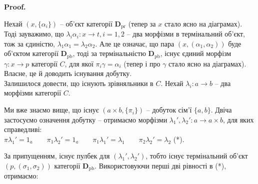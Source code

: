 \documentclass[a4paper, 10pt]{article}
\makeatletter
\theoremstyle{theoremdd}
\renewenvironment{proof}[1][Proof.\\]{\par
\pushQED{\hfill \qed}%
\normalfont \topsep6\p@\@plus6\p@\relax
\trivlist
\item\relax
{\bfseries
#1\@addpunct{.}}\hspace\labelsep\ignorespaces
}{%
\popQED\endtrivlist\@endpefalse
}
\makeatother
\begin{document}
\begin{proof}
\begin{figure}[H]
\end{figure}
\noindent Нехай $(x,\{\alpha_i\})$ -- об'єкт категорії $\textbf{D}_{\text{pr}}$ (тепер за $x$ стало ясно на діаграмах). Тоді зауважимо, що $\lambda_i \alpha_i \colon x \to t, i = 1,2$ -- два морфізми в термінальний об'єкт, тож за єдиністю, $\lambda_1 \alpha_1 = \lambda_2 \alpha_2$. Але це означає, що пара $(x,(\alpha_1,\alpha_2))$ буде об'єктом категорії $\textbf{D}_{\text{pb}}$, тоді за термінальністю $\textbf{D}_{\text{pb}}$, існує єдиний морфізм $\gamma \colon x \to p$ категорії $C$, для якої $\pi_i \gamma = \alpha_i$ (тепер і про $\gamma$ стало ясно на діаграмах). Власне, це й доводить існування добутку.
\bigskip \\
Залишилося довести, що існують зрівняльники в $C$. Нехай $\lambda_i \colon a \to b$ -- два морфізми категорії $C$.
\begin{figure}[H]
\centering
{}
\end{figure}
\noindent
Ми вже знаємо вище, що існує $(a \times b, \{\pi_i\})$ -- добуток сім'ї $\{a,b\}$. Двіча застосуємо означення добутку -- отримаємо морфізми $\lambda_1', \lambda_2' \colon a \to a \times b$, для яких справедливі:\\
$\pi \lambda_1' = 1_a \qquad \pi_1 \lambda_2' = 1_a \qquad \pi_1 \lambda_1' = \lambda_1 \qquad \pi_2 \lambda_2' = \lambda_2$ \qquad (*).
\begin{figure}[H]
\centering
{}
\qquad
{}
\end{figure}
\noindent
За припущенням, існує пулбек для $(\lambda_1',\lambda_2')$, тобто існує термінальний об'єкт $(p,(\sigma_1,\sigma_2))$ категорії $\textbf{D}_{\text{pb}}$. Використовуючи перші дві рівності в (*), отримаємо:\\

\end{proof}
\end{document}
